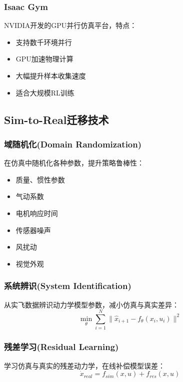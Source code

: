 \documentclass[12pt,a4paper]{ctexart}
\begin{document}
\subsubsection{Isaac Gym}

NVIDIA开发的GPU并行仿真平台，特点：
\begin{itemize}
    \item 支持数千环境并行
    \item GPU加速物理计算
    \item 大幅提升样本收集速度
    \item 适合大规模RL训练
\end{itemize}

\subsection{Sim-to-Real迁移技术}

\subsubsection{域随机化(Domain Randomization)}

在仿真中随机化各种参数，提升策略鲁棒性：
\begin{itemize}
    \item 质量、惯性参数
    \item 气动系数
    \item 电机响应时间
    \item 传感器噪声
    \item 风扰动
    \item 视觉外观
\end{itemize}

\subsubsection{系统辨识(System Identification)}

从实飞数据辨识动力学模型参数，减小仿真与真实差异：
\begin{equation}
    \min_{\theta} \sum_{i=1}^{N} \|\hat{x}_{i+1} - f_{\theta}(x_i, u_i)\|^2
\end{equation}

\subsubsection{残差学习(Residual Learning)}

学习仿真与真实的残差动力学，在线补偿模型误差：
\begin{equation}
    \dot{x}_{real} = f_{sim}(x, u) + f_{res}(x, u)
\end{equation}
\end{document}
